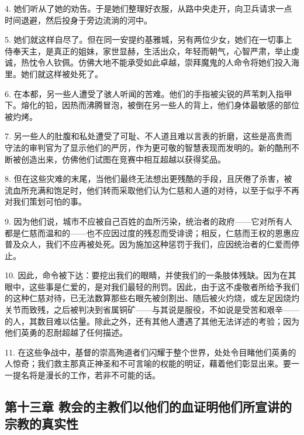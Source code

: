 4. 她们听从了她的劝告。于是她们整理好衣服，从路中央走开，向卫兵请求一点时间退避，然后投身于旁边流淌的河中。\par

5. 她们就这样自尽了。但在同一安提约基雅城，另有两位少女，她们在一切事上侍奉天主，是真正的姐妹，家世显赫，生活出众，年轻而朝气，心智严肃，举止虔诚，热忱令人钦佩。仿佛大地不能承受如此卓越，崇拜魔鬼的人命令将她们投入海里。她们就这样被处死了。\par

6. 在本都，另一些人遭受了骇人听闻的苦难。他们的手指被尖锐的芦苇刺入指甲下。熔化的铅，因热而沸腾冒泡，被倒在另一些人的背上，他们身体最敏感的部位被灼烤。\par

7. 另一些人的肚腹和私处遭受了可耻、不人道且难以言表的折磨，这些是高贵而守法的审判官为了显示他们的严厉，作为更可敬的智慧表现而发明的。新的酷刑不断被创造出来，仿佛他们试图在竞赛中相互超越以获得奖品。\par

8. 但在这些灾难的末尾，当他们最终无法想出更残酷的手段，且厌倦了杀害，被流血所充满和饱足时，他们转而采取他们认为仁慈和人道的对待，以至于似乎不再对我们策划可怕的事。\par

9. 因为他们说，城市不应被自己百姓的血所污染，统治者的政府——它对所有人都是仁慈而温和的——也不应因过度的残忍而受诽谤；相反，仁慈而王权的恩惠应普及众人，我们不应再被处死。因为施加这种惩罚于我们，应因统治者的仁爱而停止。\par

10. 因此，命令被下达：要挖出我们的眼睛，并使我们的一条肢体残缺。因为在其眼中，这些事是仁爱的，是对我们最轻的刑罚。因此，由于这不虔敬者所给予我们的这种仁慈对待，已无法数算那些右眼先被剑割出、随后被火灼烧，或左足因烧灼关节而致残，之后被判决到省属铜矿——与其说是服役，不如说是受苦和艰辛——的人，其数目难以估量。除此之外，还有其他人遭遇了其他无法详述的考验；因为他们英勇的忍耐超越了任何描述。\par

11. 在这些争战中，基督的崇高殉道者们闪耀于整个世界，处处令目睹他们英勇的人惊奇；我们救主那真正神圣和不可言喻的权能的明证，藉着他们彰显出来。要一一提名将是漫长的工作，若非不可能的话。\par


\subsection{第十三章 教会的主教们以他们的血证明他们所宣讲的宗教的真实性}

